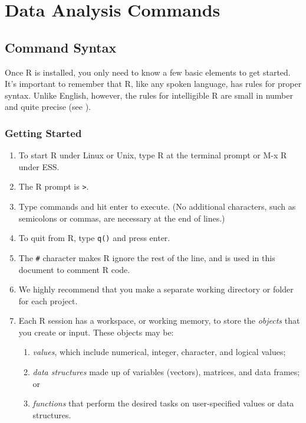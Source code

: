 \chapter{Data Analysis Commands}\label{c:R}

\section{Command Syntax}

Once R is installed, you only need to know a few basic elements to get
started.  It's important to remember that R, like any spoken
language, has rules for proper syntax.  Unlike English, however, the
rules for intelligible R are small in number and quite precise (see
).

\subsection{Getting Started}

\begin{enumerate}
\item To start R under Linux or Unix, type R at the terminal prompt or
  M-x R under ESS.
\item The R prompt is {\tt >}.
\item Type commands and hit enter to execute.  (No additional
  characters, such as semicolons or commas, are necessary at the end
  of lines.)
\item To quit from R, type \texttt{q()} and press enter.
\item The {\tt \#} character makes R ignore the rest of the line, and
  is used in this document to comment R code.
\item We highly recommend that you make a separate working directory
  or folder for each project.
\item Each R session has a workspace, or working memory, to store the
  \emph{objects} that you create or input.  These objects may be:
\begin{enumerate} 
\item \emph{values}, which include numerical, integer, character, and
  logical values;
\item \emph{data structures} made up of variables (vectors), matrices,
  and data frames; or
\item \emph{functions} that perform the desired tasks on
  user-specified values or data structures.
\end{enumerate}
\end{enumerate}

